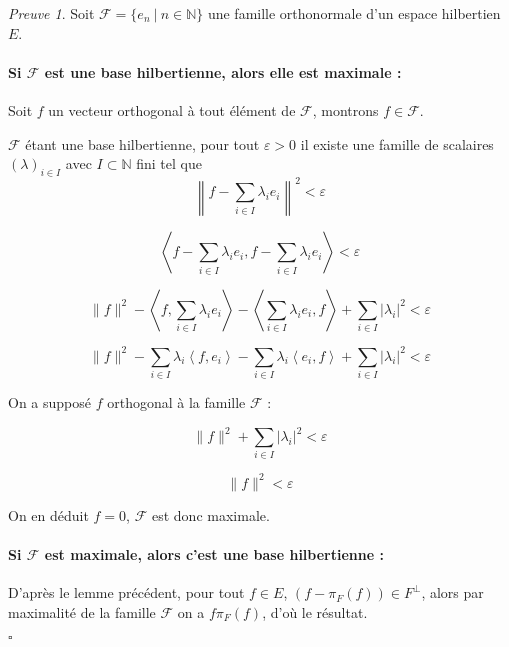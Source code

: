 \documentclass[]{article}
\theoremstyle{remark}
\newtheorem{myproof}{Preuve}
\theoremstyle{definition}
\newcommand{\cqfd}{
	\hfill$\square$
}
\begin{document}
	\begin{myproof}
		Soit $\mathcal{F} = \{e_n ~ | ~ n \in \mathbb{N}\}$ une famille orthonormale d'un espace hilbertien $E$.
		
		\paragraph{Si $\mathcal{F}$ est une base hilbertienne, alors elle est maximale :}
		
		Soit $f$ un vecteur orthogonal à tout élément de $\mathcal{F}$, montrons $f \in \mathcal{F}$.
		
		$\mathcal{F}$ étant une base hilbertienne, pour tout $\varepsilon > 0$ il existe une famille de scalaires $(\lambda)_{i \in I}$ avec $I \subset \mathbb{N}$ fini tel que $$\left\|f - \sum_{i \in I} \lambda_i e_i\right\|^2 < \varepsilon$$
		
		$$\left\langle f - \sum_{i \in I} \lambda_i e_i, f - \sum_{i \in I} \lambda_i e_i \right\rangle < \varepsilon$$
		
		$$\|f\|^2 - \left\langle f, \sum_{i \in I} \lambda_i e_i \right\rangle - \left\langle \sum_{i \in I} \lambda_i e_i, f \right\rangle + \sum_{i \in I} |\lambda_i|^2 < \varepsilon$$
		
		$$\|f\|^2 - \sum_{i \in I} \lambda_i \left\langle f, e_i \right\rangle - \sum_{i \in I} \lambda_i \left\langle e_i, f \right\rangle + \sum_{i \in I} |\lambda_i|^2 < \varepsilon$$
		
		On a supposé $f$ orthogonal à la famille $\mathcal{F}$ :
		
		$$\|f\|^2 + \sum_{i \in I} |\lambda_i|^2 < \varepsilon$$
		
		$$\|f\|^2 < \varepsilon$$
		
		On en déduit $f = 0$, $\mathcal{F}$ est donc maximale.
		
		\paragraph{Si $\mathcal{F}$ est maximale, alors c'est une base hilbertienne :}
		
		D'après le lemme précédent, pour tout $f \in E$, $(f - \pi_F(f)) \in F^\bot$, alors par maximalité de la famille $\mathcal{F}$ on a $f  \pi_F(f)$, d'où le résultat.
		
		\cqfd
	\end{myproof}
\end{document}
